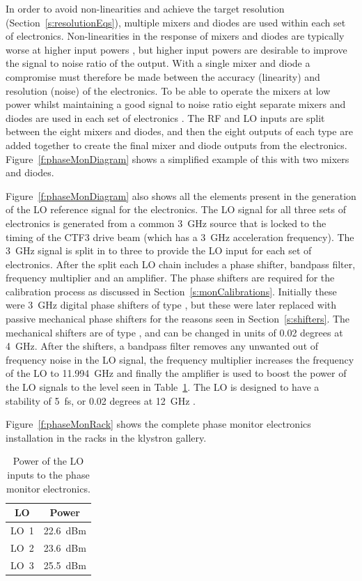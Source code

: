 In order to avoid non-linearities and achieve the target resolution (Section~\ref{s:resolutionEqs}), multiple mixers and diodes are used within each set of electronics. Non-linearities in the response of mixers and diodes are typically worse at higher input powers \cite{alex09}, but higher input powers are desirable to improve the signal to noise ratio of the output. With a single mixer and diode a compromise must therefore be made between the accuracy (linearity) and resolution (noise) of the electronics. To be able to operate the mixers at low power whilst maintaining a good signal to noise ratio eight separate mixers and diodes are used in each set of electronics \cite{alex09}. The RF and LO inputs are split between the eight mixers and diodes, and then the eight outputs of each type are added together to create the final mixer and diode outputs from the electronics. Figure~\ref{f:phaseMonDiagram} shows a simplified example of this with two mixers and diodes.

Figure~\ref{f:phaseMonDiagram} also shows all the elements present in the generation of the LO reference signal for the electronics. The LO signal for all three sets of electronics is generated from a common 3~GHz source that is locked to the timing of the CTF3 drive beam (which has a 3~GHz acceleration frequency). The 3~GHz signal is split in to three to provide the LO input for each set of electronics. After the split each LO chain includes a phase shifter, bandpass filter, frequency multiplier and an amplifier. The phase shifters are required for the calibration process as discussed in Section~\ref{s:monCalibrations}. Initially these were 3~GHz digital phase shifters of type \cite{reyShifters}, but these were later replaced with passive mechanical phase shifters for the reasons seen in Section~\ref{s:shifters}. The mechanical shifters are of type \cite{mechPhShift}, and can be changed in units of 0.02 degrees at 4~GHz. After the shifters, a bandpass filter \cite{klFilter} removes any unwanted out of frequency noise in the LO signal, the frequency multiplier \cite{freqMulti} increases the frequency of the LO to 11.994~GHz and finally the amplifier \cite{amp12GHz} is used to boost the power of the LO signals to the level seen in Table~\ref{t:loPowers}. The LO is designed to have a stability of 5~fs, or 0.02 degrees at 12~GHz \cite{alex09}.

Figure~\ref{f:phaseMonRack} shows the complete phase monitor electronics installation in the racks in the klystron gallery.

\begin{table}
  \begin{center}
    \begin{tabular}{|c c|}
	   \hline
       LO & Power \\ \hline
       LO~1 & 22.6~dBm \\
       LO~2 & 23.6~dBm \\
       LO~3 & 25.5~dBm \\ \hline
    \end{tabular}
    \caption{Power of the LO inputs to the phase monitor electronics.}
  	\label{t:loPowers}
  \end{center}
\end{table}

